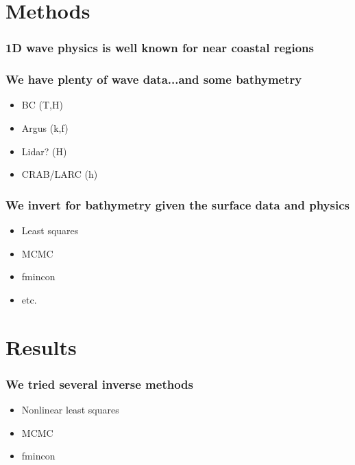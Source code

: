 \documentclass[7pt]{beamer}
\begin{document}
\section{Methods}
\begin{frame}
 \frametitle{1D wave physics is well known for near coastal regions}

\end{frame}
\begin{frame}
 \frametitle{We have plenty of wave data...and some bathymetry}

\begin{itemize}
\item BC (T,H)
\item Argus (k,f)
\item Lidar? (H)
\item CRAB/LARC (h)
\end{itemize}


\end{frame}
\begin{frame}
 \frametitle{We invert for bathymetry given the surface data and physics}

\begin{itemize}
\item Least squares
\item MCMC
\item fmincon
\item etc.
\end{itemize}


\end{frame}
\section{Results}
\begin{frame}
 \frametitle{We tried several inverse methods}
\begin{itemize}
\item Nonlinear least squares
\item MCMC
\item fmincon
\end{itemize}
\end{frame}
\end{document}
